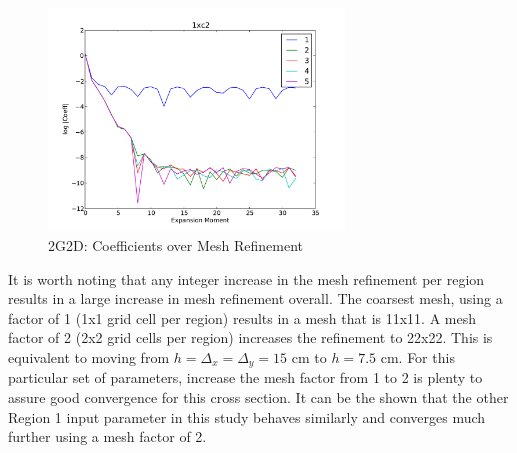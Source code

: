 \begin{figure}[H]
\centering
   \includegraphics[width=0.7\textwidth]{../graphics/cof_decay_1xc2_meshes}
   \caption{2G2D: Coefficients over Mesh Refinement}
   \label{fig:2g2d 1xc2 cof decay}
\end{figure}
It is worth noting that any integer increase in the mesh refinement per region results in a large increase in mesh refinement overall.  The coarsest mesh, using a factor of 1 (1x1 grid cell per region) results in a mesh that is 11x11.  A mesh factor of 2 (2x2 grid cells per region) increases the refinement to 22x22.  This is equivalent to moving from $h=\Delta_x=\Delta_y=15$ cm to $h=7.5$ cm.  For this particular set of parameters, increase the mesh factor from 1 to 2 is plenty to assure good convergence for this cross section.  It can be the shown that the other Region 1 input parameter in this study behaves similarly and converges much further using a mesh factor of 2.

